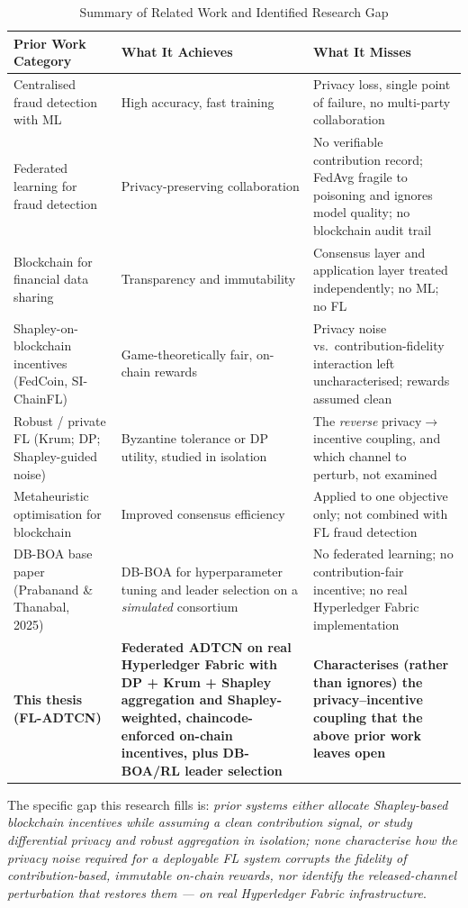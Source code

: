 \begin{table}[!htbp]
\centering
\caption{Summary of Related Work and Identified Research Gap}
\label{tab:related_work_gap}
\begin{tabular}{p{3.8cm}p{4cm}p{6.2cm}}
\toprule
\textbf{Prior Work Category} & \textbf{What It Achieves} & \textbf{What It Misses} \\
\midrule
Centralised fraud detection with ML & High accuracy, fast training & Privacy loss, single point of failure, no multi-party collaboration \\
\midrule
Federated learning for fraud detection & Privacy-preserving collaboration & No verifiable contribution record; FedAvg fragile to poisoning and ignores model quality; no blockchain audit trail \\
\midrule
Blockchain for financial data sharing & Transparency and immutability & Consensus layer and application layer treated independently; no ML; no FL \\
\midrule
Shapley-on-blockchain incentives (FedCoin, SI-ChainFL) & Game-theoretically fair, on-chain rewards & Privacy noise vs.\ contribution-fidelity interaction left uncharacterised; rewards assumed clean \\
\midrule
Robust / private FL (Krum; DP; Shapley-guided noise) & Byzantine tolerance or DP utility, studied in isolation & The \emph{reverse} privacy$\rightarrow$incentive coupling, and which channel to perturb, not examined \\
\midrule
Metaheuristic optimisation for blockchain & Improved consensus efficiency & Applied to one objective only; not combined with FL fraud detection \\
\midrule
DB-BOA base paper (Prabanand \& Thanabal, 2025)~\cite{prabanand2025} & DB-BOA for hyperparameter tuning and leader selection on a \emph{simulated} consortium & No federated learning; no contribution-fair incentive; no real Hyperledger Fabric implementation \\
\midrule
\textbf{This thesis (FL-ADTCN)} & \textbf{Federated ADTCN on real Hyperledger Fabric with DP + Krum + Shapley aggregation and Shapley-weighted, chaincode-enforced on-chain incentives, plus DB-BOA/RL leader selection} & \textbf{Characterises (rather than ignores) the privacy--incentive coupling that the above prior work leaves open} \\
\bottomrule
\end{tabular}
\end{table}

The specific gap this research fills is: \textit{prior systems either allocate Shapley-based blockchain incentives while assuming a clean contribution signal, or study differential privacy and robust aggregation in isolation; none characterise how the privacy noise required for a deployable FL system corrupts the fidelity of contribution-based, immutable on-chain rewards, nor identify the released-channel perturbation that restores them --- on real Hyperledger Fabric infrastructure}.

